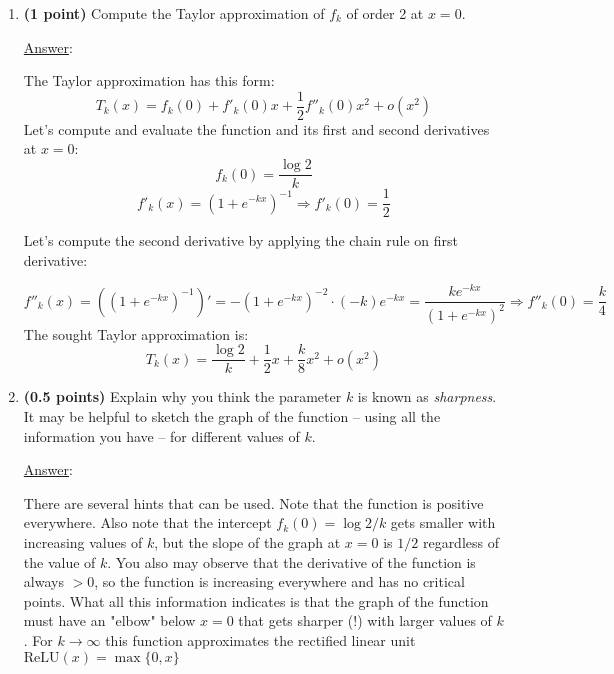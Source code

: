 \documentclass[]{book}
\theoremstyle{definition}
\newcommand\ans{\underline{Answer}: }
\begin{document}
\begin{enumerate}
\begin{enumerate}
\item {\bf (1 point)} Compute the Taylor approximation of $f_k$ of order 2 at $x=0$.

\ans

The Taylor approximation has this form:
\[
T_k(x) = f_k(0) + f'_k(0)x + \frac{1}{2}f''_k(0)x^2 + o(x^2)
\]
Let's compute and evaluate the function and its first and second derivatives at $x=0$:
\[
f_k(0) = \frac{\log 2}{k}
\]
\[
f'_k(x) = (1 + e^{-kx})^{-1} \Rightarrow f'_k(0) = \frac{1}{2}
\]

Let's compute the second derivative by applying the chain rule on first derivative:

\[
f''_k(x) = ((1 + e^{-kx})^{-1})' = -(1+e^{-kx})^{-2}\cdot (-k)e^{-kx} = \frac{ke^{-kx}}{(1 + e^{-kx})^2} \Rightarrow f''_k(0) = \frac{k}{4} 
\]
The sought Taylor approximation is:
\[
T_k(x) = \frac{\log 2}{k} + \frac{1}{2}x + \frac{k}{8}x^2 + o(x^2)
\]

\item {\bf (0.5 points)} Explain why you think the parameter $k$ is known as \emph{sharpness}. It may be helpful to sketch the graph of the function -- using all the information you have -- for different values of $k$.

\ans

There are several hints that can be used. Note that the function is positive everywhere. Also note that the intercept $f_k(0)=\log2 / k$ gets smaller with increasing values of $k$, but the slope of the graph at $x=0$ is $1/2$ regardless of the value of $k$. You also may observe that the derivative of the function is always $>0$, so the function is increasing everywhere and has no critical points. What all this information indicates is that the graph of the function must have an "elbow" below $x=0$ that gets sharper (!) with larger values of $k$. For $k\to\infty$ this function approximates the rectified linear unit $\textrm{ReLU}(x) = \max\{0, x\}$

\begin{center}
\end{center}



\end{enumerate}
\end{enumerate}
\end{document}
